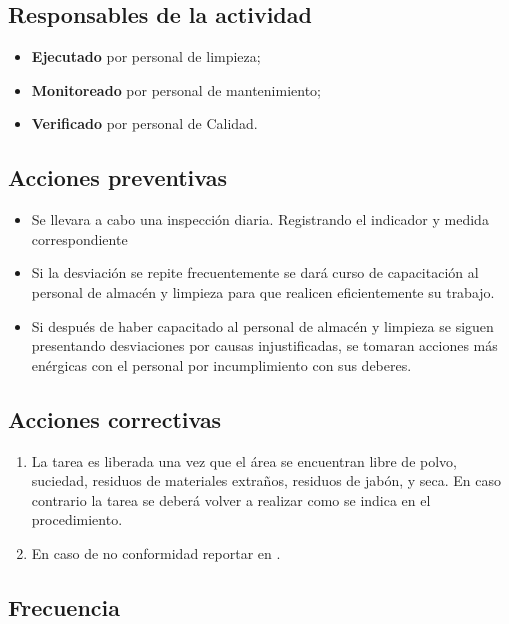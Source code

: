 \subsection{Responsables de la actividad}

\begin{itemize}
	\item \textbf{Ejecutado} por personal de limpieza;
	\item \textbf{Monitoreado} por personal de mantenimiento;
	\item \textbf{Verificado} por personal de Calidad.
\end{itemize}

\subsection{Acciones preventivas}

\begin{itemize}
	\item Se llevara a cabo una inspección diaria. Registrando el indicador y medida correspondiente
	\item Si la desviación se repite frecuentemente se dará curso de capacitación al personal de almacén y limpieza para que realicen eficientemente su trabajo.
	\item Si después de haber capacitado al personal de almacén y limpieza se siguen presentando desviaciones por causas injustificadas, se tomaran acciones más enérgicas con el personal por incumplimiento con sus deberes.
\end{itemize}

\subsection{Acciones correctivas}

\begin{enumerate}
	\item La tarea es liberada una vez que el área se encuentran libre de polvo, suciedad, residuos de materiales extraños, residuos de jabón, y seca. En caso contrario la tarea se deberá volver a realizar como se indica en el procedimiento.
	\item En caso de no conformidad reportar en \RAC.
\end{enumerate}

\subsection{Frecuencia}

